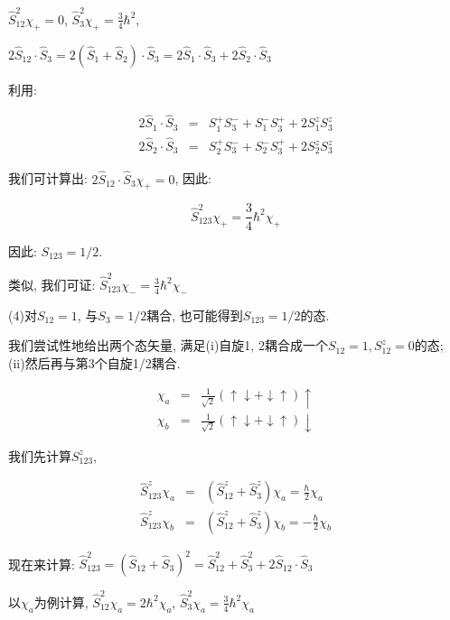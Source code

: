 $\hat S_{12}^2 \chi_+ = 0$, $\hat S_3^2 \chi_+ =
\frac{3}{4}\hbar^2$,


$2 \hat S_{12}\cdot\hat S_3 = 2(\hat S_1 + \hat S_2) \cdot \hat S_3
= 2 \hat S_1 \cdot \hat S_3 + 2 \hat S_2 \cdot \hat S_3$

利用:

\begin{eqnarray*}
2 \hat S_1 \cdot \hat S_3 &=& S_1^+ S_3^- + S_1^-S_3^+ + 2 S_1^z S_3^z \\
2 \hat S_2 \cdot \hat S_3 &=& S_2^+ S_3^- + S_2^-S_3^+ + 2 S_2^z
S_3^z
\end{eqnarray*}

我们可计算出: $2 \hat S_{12}\cdot\hat S_3 \chi_+ = 0$, 因此:

\begin{equation*}
\hat S_{123}^2 \chi_+ = \frac{3}{4}\hbar^2 \chi_+
\end{equation*}

因此: $S_{123} = 1/2$.

类似, 我们可证: $\hat S_{123}^2 \chi_- = \frac{3}{4}\hbar^2 \chi_-$

(4)对$S_{12} = 1$, 与$S_3=1/2$耦合, 也可能得到$S_{123}=1/2$的态.

我们尝试性地给出两个态矢量, 满足(i)自旋1, 2耦合成一个$S_{12}=1,
S_{12}^z =0$的态; (ii)然后再与第3个自旋1/2耦合.

\begin{eqnarray*}
  \chi_a &=& \frac{1}{\sqrt 2} \left(\uparrow \downarrow + \downarrow \uparrow \right) \uparrow \\
  \chi_b &=& \frac{1}{\sqrt 2} \left(\uparrow \downarrow + \downarrow \uparrow \right) \downarrow
\end{eqnarray*}

我们先计算$S_{123}^z$,


\begin{eqnarray*}
\hat S_{123}^z \chi_a &=& \left( \hat S_{12}^z + \hat S_3^z \right)
\chi_a = \frac{\hbar}{2} \chi_a \\
\hat S_{123}^z \chi_b &=& \left( \hat S_{12}^z + \hat S_3^z \right)
\chi_b = - \frac{\hbar}{2} \chi_b
\end{eqnarray*}

现在来计算: $\hat S_{123}^2 = \left(\hat S_{12} + \hat S_3 \right)^2
= \hat S_{12}^2 + \hat S_3^2 + 2 \hat S_{12} \cdot \hat S_3 $

以$\chi_a$为例计算, $\hat S_{12}^2 \chi_a = 2\hbar^2 \chi_a$, $\hat
S_3^2 \chi_a = \frac{3}{4}\hbar^2 \chi_a$

